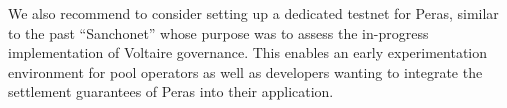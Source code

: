We also recommend to consider setting up a dedicated testnet for Peras, similar to the past \enquote{Sanchonet} whose purpose was to assess the in-progress implementation of Voltaire governance.
This enables an early experimentation environment for pool operators as well as developers wanting to integrate the settlement guarantees of Peras into their application.

